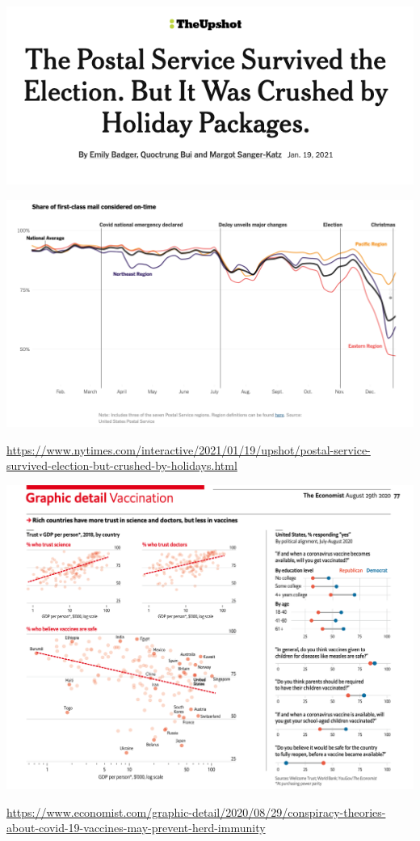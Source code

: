 \documentclass[table]{beamer}\usepackage[]{graphicx}\usepackage[]{color}
\begin{document}
\begin{frame}

\centering

\includegraphics[width=.6\textwidth]{figure-static/upshot-postal-banner.png}

\includegraphics[width=.9\textwidth]{figure-static/upshot-postal-timeseries.png}

\tiny \url{https://www.nytimes.com/interactive/2021/01/19/upshot/postal-service-survived-election-but-crushed-by-holidays.html}

\end{frame}



\begin{frame}

\centering 

\includegraphics[width=\textwidth]{figure-static/graphic-detail-vaccination.png}

\tiny \url{https://www.economist.com/graphic-detail/2020/08/29/conspiracy-theories-about-covid-19-vaccines-may-prevent-herd-immunity}

\end{frame}
\end{document}
